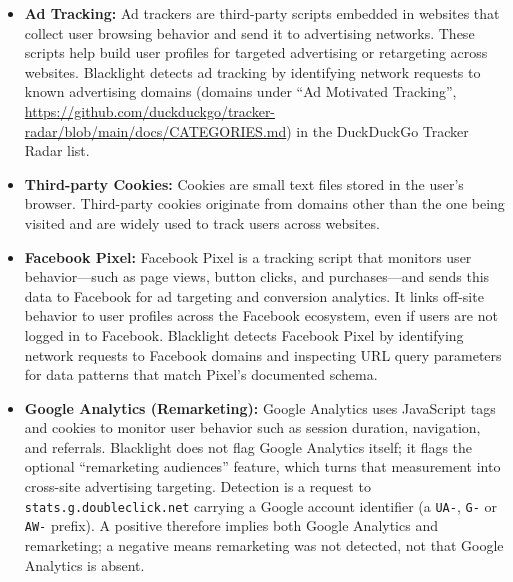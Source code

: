 \documentclass[12pt, letterpaper]{article}
\begin{document}
\begin{itemize}
    \item{
        \textbf{Ad Tracking:} 
        Ad trackers are third-party scripts embedded in websites that collect user browsing behavior and send it to advertising networks. These scripts help build user profiles for targeted advertising or retargeting across websites. Blacklight detects ad tracking by identifying network requests to known advertising domains (domains under ``Ad Motivated Tracking'', \url{https://github.com/duckduckgo/tracker-radar/blob/main/docs/CATEGORIES.md}) in the DuckDuckGo Tracker Radar list.
    }
    \item{
        \textbf{Third-party Cookies:} 
        Cookies are small text files stored in the user's browser.
        Third-party cookies originate from domains other than the one being visited and are widely used to track users across websites.
    }
    \item{
        \textbf{Facebook Pixel:} 
        Facebook Pixel is a tracking script that monitors user behavior---such as page views, button clicks, and purchases---and sends this data to Facebook for ad targeting and conversion analytics.
        It links off-site behavior to user profiles across the Facebook ecosystem, even if users are not logged in to Facebook.
        Blacklight detects Facebook Pixel by identifying network requests to Facebook domains and inspecting URL query parameters for data patterns that match Pixel's documented schema.    
    }
    \item{
        \textbf{Google Analytics (Remarketing):} 
        Google Analytics uses JavaScript tags and cookies to monitor user behavior such as session duration, navigation, and referrals. Blacklight does not flag Google Analytics itself; it flags the optional ``remarketing audiences'' feature, which turns that measurement into cross-site advertising targeting.
        Detection is a request to \texttt{stats.g.doubleclick.net} carrying a Google account identifier (a \texttt{UA-}, \texttt{G-} or \texttt{AW-} prefix). A positive therefore implies both Google Analytics and remarketing; a negative means remarketing was not detected, not that Google Analytics is absent.
    }


\end{itemize}
\end{document}
